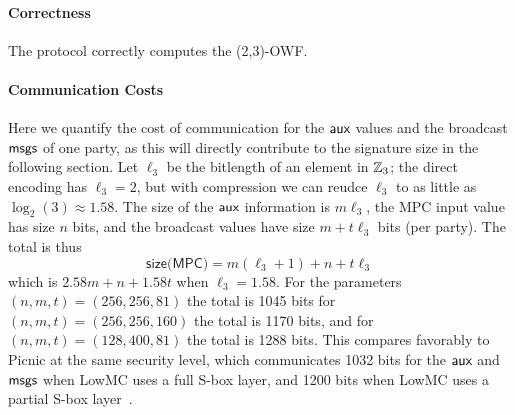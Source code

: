 \paragraph{Correctness} The protocol correctly computes the (2,3)-OWF. 


\paragraph{Communication Costs}
Here we quantify the cost of communication for the $\textsf{aux}$ values and the broadcast $\textsf{msgs}$ of one party,
as this will directly contribute to the signature size in the following section. 
Let $\ell_3$ be the bitlength of an element in $\mathbb{Z}_3$; the direct encoding has
$\ell_3 = 2$, but with compression we can reudce $\ell_3$ to as little as
$\log_2(3) \approx 1.58$.    The size of the
$\textsf{aux}$ information is $m\ell_3$, the MPC input value has size $n$ bits, 
and the broadcast values have size $m + t\ell_3$ bits (per party). 
The total is thus 
\[\textsf{size(MPC)} = m(\ell_3 + 1) + n + t\ell_3 \]
which is $2.58m + n + 1.58t$ when $\ell_3 = 1.58$. 
For the parameters $(n,m,t) = (256, 256, 81)$ the total is 1045 bits for
$(n,m,t) = (256, 256, 160)$ the total is 1170 bits, and for
$(n,m,t)=(128, 400, 81)$ the total is 1288 bits.  This compares favorably to
Picnic at the same security level, which communicates 1032 bits for the $\textsf{aux}$
and $\textsf{msgs}$ when LowMC uses a full S-box layer, and 1200 bits when LowMC
uses a partial S-box layer~\cite{TCHES:KalZav20}. 

